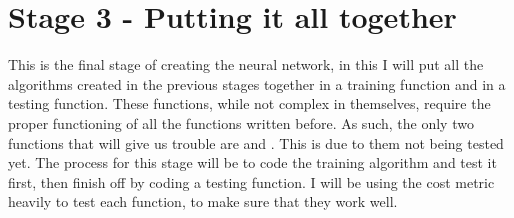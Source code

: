 \documentclass{report}
\begin{document}
\section{Stage 3 - Putting it all together}
This is the final stage of creating the neural network, in this I will put all the algorithms created in the previous stages together in a training function and in a testing function. These functions, while not complex in themselves, require the proper functioning of all the functions written before. As such, the only two functions that will give us trouble are  and . This is due to them not being tested yet.
\newline 
The process for this stage will be to code the training algorithm and test it first, then finish off by coding a testing function. I will be using the cost metric heavily to test each function, to make sure that they work well.
\end{document}
